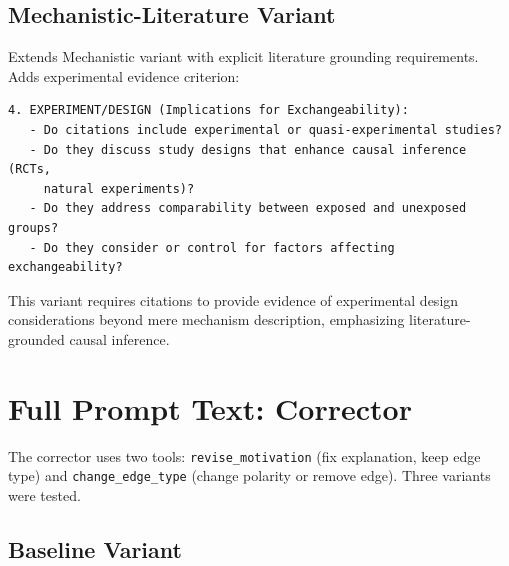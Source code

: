 \subsection{Mechanistic-Literature Variant}
\label{sec:prompt_citation_mechanistic_lit}

Extends Mechanistic variant with explicit literature grounding requirements. Adds experimental evidence criterion:

\begin{small}
\begin{verbatim}
4. EXPERIMENT/DESIGN (Implications for Exchangeability):
   - Do citations include experimental or quasi-experimental studies?
   - Do they discuss study designs that enhance causal inference (RCTs,
     natural experiments)?
   - Do they address comparability between exposed and unexposed groups?
   - Do they consider or control for factors affecting exchangeability?
\end{verbatim}
\end{small}

\noindent This variant requires citations to provide evidence of experimental design considerations beyond mere mechanism description, emphasizing literature-grounded causal inference.

\section{Full Prompt Text: Corrector}
\label{sec:corrector_prompt_text}

The corrector uses two tools: \texttt{revise\_motivation} (fix explanation, keep edge type) and \texttt{change\_edge\_type} (change polarity or remove edge). Three variants were tested.

\subsection{Baseline Variant}
\label{sec:prompt_corrector_baseline}

